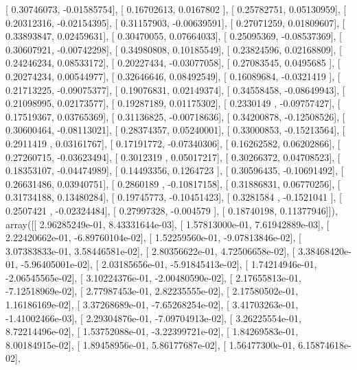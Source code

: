 \documentclass{article}
\begin{document}
       [ 0.30746073, -0.01585754],
       [ 0.16702613,  0.0167802 ],
       [ 0.25782751,  0.05130959],
       [ 0.20312316, -0.02154395],
       [ 0.31157903, -0.00639591],
       [ 0.27071259,  0.01809607],
       [ 0.33893847,  0.02459631],
       [ 0.30470055,  0.07664033],
       [ 0.25095369, -0.08537369],
       [ 0.30607921, -0.00742298],
       [ 0.34980808,  0.10185549],
       [ 0.23824596,  0.02168809],
       [ 0.24246234,  0.08533172],
       [ 0.20227434, -0.03077058],
       [ 0.27083545,  0.0495685 ],
       [ 0.20274234,  0.00544977],
       [ 0.32646646,  0.08492549],
       [ 0.16089684, -0.0321419 ],
       [ 0.21713225, -0.09075377],
       [ 0.19076831,  0.02149374],
       [ 0.34558458, -0.08649943],
       [ 0.21098995,  0.02173577],
       [ 0.19287189,  0.01175302],
       [ 0.2330149 , -0.09757427],
       [ 0.17519367,  0.03765369],
       [ 0.31136825, -0.00718636],
       [ 0.34200878, -0.12508526],
       [ 0.30600464, -0.08113021],
       [ 0.28374357,  0.05240001],
       [ 0.33000853, -0.15213564],
       [ 0.2911419 ,  0.03161767],
       [ 0.17191772, -0.07340306],
       [ 0.16262582,  0.06202866],
       [ 0.27260715, -0.03623494],
       [ 0.3012319 ,  0.05017217],
       [ 0.30266372,  0.04708523],
       [ 0.18353107, -0.04474989],
       [ 0.14493356,  0.1264723 ],
       [ 0.30596435, -0.10691492],
       [ 0.26631486,  0.03940751],
       [ 0.2860189 , -0.10817158],
       [ 0.31886831,  0.06770256],
       [ 0.31734188,  0.13480284],
       [ 0.19745773, -0.10451423],
       [ 0.3281584 , -0.1521041 ],
       [ 0.2507421 , -0.02324484],
       [ 0.27997328, -0.004579  ],
       [ 0.18740198,  0.11377946]]), array([[  2.96285249e-01,   8.43331644e-03],
       [  1.57813000e-01,   7.61942889e-03],
       [  2.22420662e-01,  -6.89760104e-02],
       [  1.52259560e-01,  -9.07813846e-02],
       [  3.07383833e-01,   3.58446581e-02],
       [  2.80356622e-01,   4.72506658e-02],
       [  3.38468420e-01,  -5.96405001e-02],
       [  2.03185656e-01,  -5.91845413e-02],
       [  1.74214946e-01,  -2.06545565e-02],
       [  3.10224376e-01,  -2.00480590e-02],
       [  2.17655813e-01,  -7.12518969e-02],
       [  2.77987453e-01,   2.82235555e-02],
       [  2.17580502e-01,   1.16186169e-02],
       [  3.37268689e-01,  -7.65268254e-02],
       [  3.41703263e-01,  -1.41002466e-03],
       [  2.29304876e-01,  -7.09704913e-02],
       [  3.26225554e-01,   8.72214496e-02],
       [  1.53752088e-01,  -3.22399721e-02],
       [  1.84269583e-01,   8.00184915e-02],
       [  1.89458956e-01,   5.86177687e-02],
       [  1.56477300e-01,   6.15874618e-02],
\end{document}
